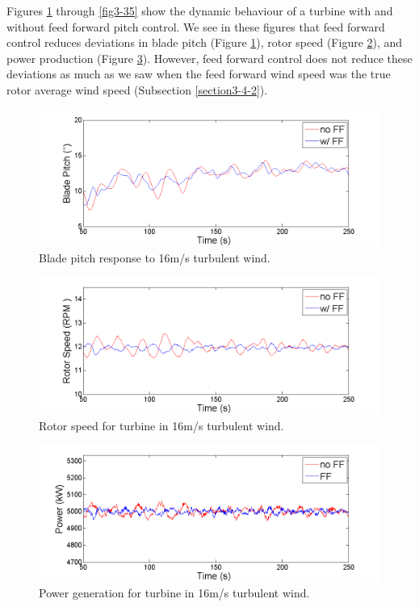 Figures \ref{fig3-31} through \ref{fig3-35} show the dynamic behaviour of a turbine with and without feed forward pitch control. We see in these figures that feed forward control reduces deviations in blade pitch (Figure \ref{fig3-31}), rotor speed (Figure \ref{fig3-32}), and power production (Figure \ref{fig3-33}). However, feed forward control does not reduce these deviations as much as we saw when the feed forward wind speed was the true rotor average wind speed (Subsection \ref{section3-4-2}). 

\begin{figure}[htbp]
	\centering
		\includegraphics[trim = {1cm 0 2cm 0}, clip, width = \linewidth]{Figures/ch3Figures/fig3-31.png}
		
	\caption{Blade pitch response to 16m/s turbulent wind.}
	\label{fig3-31}
\end{figure}

\begin{figure}[htbp]
	\centering
		\includegraphics[trim = {1cm 0 2cm 0}, clip, width = \linewidth]{Figures/ch3Figures/fig3-32.png}
		
	\caption{Rotor speed for turbine in 16m/s turbulent wind.}
	\label{fig3-32}
\end{figure}

\begin{figure}[htbp]
	\centering
		\includegraphics[trim = {1cm 0 2cm 0}, clip, width = \linewidth]{Figures/ch3Figures/fig3-33.png}
		
	\caption{Power generation for turbine in 16m/s turbulent wind.}
	\label{fig3-33}
\end{figure}

